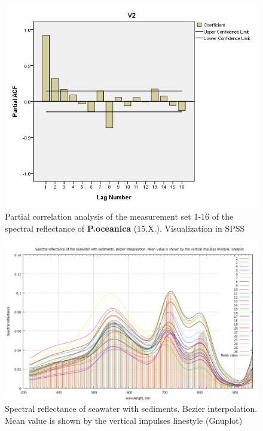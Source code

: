 \documentclass[10pt, a4paper]{article}
\begin{document}
\begin{appendices}
\begin{figure}[H]
\centering
\includegraphics[scale=0.45]{Partial_Corr.jpg}
\caption{Partial correlation analysis of the measurement set 1-16 of the spectral reflectance of \textbf{P.oceanica} (15.X.). Visualization in SPSS}
\label{fig:51}
\end{figure}
\pagebreak
\newpage


\begin{figure}[h]
\begin{center}
\includegraphics[scale=0.25]{GNU-09.jpg}
\caption{Spectral reflectance of seawater with sediments. Bezier interpolation. Mean value is shown by the vertical impulses linestyle (Gnuplot)­}
\label{fig:52}
\end{center}
\end{figure}


\end{appendices}
\end{document}
